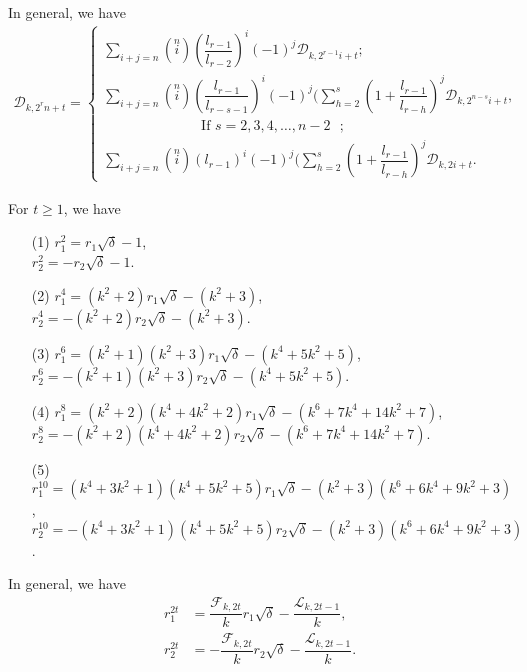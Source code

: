 In general, we have 
\begin{align*}
 \mathcal{D}_{k,{2^rn+t}}= \begin{cases}
\sum\limits_{i+j=n}\left( \stackrel{n}{i}\right)(\dfrac{l_{r-1}}{l_{r-2}})^i(-1)^j \mathcal{D}_{k,2^{r-1}i+t};\\
\sum\limits_{i+j=n}\left( \stackrel{n}{i}\right)(\dfrac{l_{r-1}}{l_{r-s-1}})^i(-1)^j (\sum_{h=2}^s(1+\dfrac{l_{r-1}}{l_{r-h}})^j\mathcal{D}_{k,2^{n-s}i+t}, \\\quad\quad\quad\quad\quad\quad\quad \text{If $s=2, 3, 4,\hdots, n-2 $ };\\\sum\limits_{i+j=n}\left( \stackrel{n}{i}\right)({l_{r-1}})^i(-1)^j (\sum_{h=2}^s(1+\dfrac{l_{r-1}}{l_{r-h}})^j\mathcal{D}_{k,2i+t}.
 \end{cases}
\end{align*}
 \begin{lemma}\label{3.12}
 For $t\geq 1$, we have
 \begin{enumerate}
 \item[(1)] $r_1^2=r_1\sqrt{\delta}-1$,\\
   $r_2^2=-r_2\sqrt{\delta}-1$.
   \item[(2)] $r_1^4=(k^2+2)r_1\sqrt{\delta}-(k^2+3)$,\\
   $r_2^4=-(k^2+2)r_2\sqrt{\delta}-(k^2+3)$.
    \item[(3)] $r_1^6=(k^2+1)(k^2+3)r_1\sqrt{\delta}-(k^4+5k^2+5)$,\\
   $r_2^6=-(k^2+1)(k^2+3)r_2\sqrt{\delta}-(k^4+5k^2+5)$.
    \item[(4)] $r_1^8=(k^2+2)(k^4+4k^2+2)r_1\sqrt{\delta}-(k^6+7k^4+14k^2+7)$,\\
   $r_2^8=-(k^2+2)(k^4+4k^2+2)r_2\sqrt{\delta}-(k^6+7k^4+14k^2+7)$.
   \item[(5)] $r_1^{10}=(k^4+3k^2+1)(k^4+5k^2+5)r_1\sqrt{\delta}-(k^2+3)(k^6+6k^4+9k^2+3)$,\\
   $r_2^{10}=-(k^4+3k^2+1)(k^4+5k^2+5)r_2\sqrt{\delta}-(k^2+3)(k^6+6k^4+9k^2+3)$.
    \end{enumerate}
    In general, we have
    \begin{align*}
    r_1^{2t}&=\dfrac{\mathcal{F}_{k,2t}}{k}r_1\sqrt{\delta}-\dfrac{\mathcal{L}_{k,2t-1}}{k},\\
    r_2^{2t}&=-\dfrac{\mathcal{F}_{k,2t}}{k}r_2\sqrt{\delta}-\dfrac{\mathcal{L}_{k,2t-1}}{k}.
    \end{align*}
     \end{lemma}
